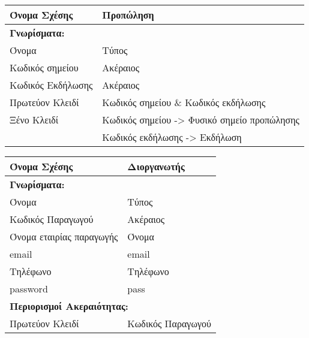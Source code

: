 \begin{tabular}{|p{6cm}|p{8cm}|}
  \hline
  Όνομα Σχέσης      & Προπώληση                            \\ \hline
  \multicolumn{2}{|l|}{\textbf{Γνωρίσματα:}}               \\ \hline
  Όνομα             & Τύπος                                \\ \hline
  Κωδικός σημείου   & Ακέραιος                             \\ \hline
  Κωδικός Εκδήλωσης & Ακέραιος                             \\ \hline
  Πρωτεύον Κλειδί   & Κωδικός σημείου \& Κωδικός εκδήλωσης \\ \hline
  Ξένο Κλειδί       & Κωδικός σημείου -> Φυσικό σημείο προπώλησης
                                                           \\ \hline
                    & Κωδικός εκδήλωσης -> Εκδήλωση        \\ \hline
\end{tabular}


\begin{tabular}{|p{6cm}|p{8cm}|}
  \hline
  Όνομα Σχέσης             & Διοργανωτής                   \\ \hline
  \multicolumn{2}{|l|}{\textbf{Γνωρίσματα:}}               \\ \hline
  Όνομα                    & Τύπος                         \\ \hline
  Κωδικός Παραγωγού        & Ακέραιος                      \\ \hline
  Όνομα εταιρίας παραγωγής & Όνομα                         \\ \hline
  email                    & email                         \\ \hline
  Τηλέφωνο                 & Τηλέφωνο                      \\ \hline
  password                 & pass                          \\ \hline
  \multicolumn{2}{|l|}{\textbf{Περιορισμοί Ακεραιότητας:}} \\ \hline
  Πρωτεύον Κλειδί          & Κωδικός Παραγωγού             \\ \hline
\end{tabular}



